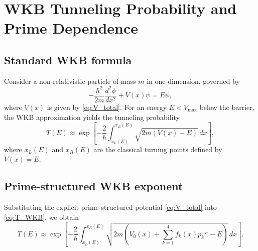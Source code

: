 \documentclass[11pt]{article}
\begin{document}
\section{WKB Tunneling Probability and Prime Dependence}

\subsection{Standard WKB formula}

Consider a non-relativistic particle of mass \(m\) in one dimension,
governed by
\begin{equation}
  -\frac{\hbar^2}{2m}\frac{d^2\psi}{dx^2} + V(x)\psi = E\psi,
\end{equation}
where \(V(x)\) is given by \eqref{eq:V_total}. For an energy
\(E < V_{\text{max}}\) below the barrier, the WKB approximation yields
the tunneling probability
\begin{equation}
  T(E) \approx
  \exp\left[
    -\frac{2}{\hbar}
    \int_{x_L(E)}^{x_R(E)}
    \sqrt{2m\left(V(x) - E\right)}\,dx
  \right],
  \label{eq:T_WKB}
\end{equation}
where \(x_L(E)\) and \(x_R(E)\) are the classical turning points
defined by \(V(x)=E\).

\subsection{Prime-structured WKB exponent}

Substituting the explicit prime-structured potential \eqref{eq:V_total}
into \eqref{eq:T_WKB}, we obtain
\begin{equation}
  T(E) \approx
  \exp\left[
    -\frac{2}{\hbar}
    \int_{x_L(E)}^{x_R(E)}
    \sqrt{
      2m\left(
        V_0(x) + \sum_{k=1}^{4} f_k(x)p_k^{-\sigma} - E
      \right)
    }\,dx
  \right].
  \label{eq:T_prime_structured}
\end{equation}
\end{document}
